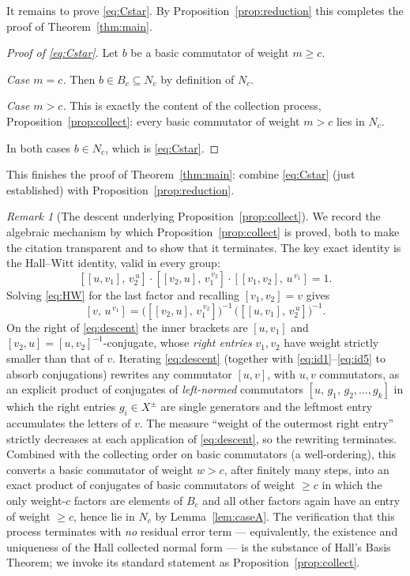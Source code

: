 \documentclass{amsart}
\theoremstyle{definition}
\theoremstyle{remark}
\newtheorem{remark}{Remark}
\begin{document}
It remains to prove \eqref{eq:Cstar}. By Proposition~\ref{prop:reduction} this
completes the proof of Theorem~\ref{thm:main}.

\begin{proof}[Proof of \eqref{eq:Cstar}]
Let $b$ be a basic commutator of weight $m\ge c$.

\emph{Case $m=c$.} Then $b\in B_c\subseteq N_c$ by definition of $N_c$.

\emph{Case $m>c$.} This is exactly the content of the collection process,
Proposition~\ref{prop:collect}: every basic commutator of weight $m>c$ lies in
$N_c$.

In both cases $b\in N_c$, which is \eqref{eq:Cstar}.
\end{proof}

This finishes the proof of Theorem~\ref{thm:main}: combine
\eqref{eq:Cstar} (just established) with Proposition~\ref{prop:reduction}.

\begin{remark}[The descent underlying Proposition~\ref{prop:collect}]
\label{rem:descent}
We record the algebraic mechanism by which Proposition~\ref{prop:collect} is
proved, both to make the citation transparent and to show that it terminates. The
key exact identity is the Hall--Witt identity, valid in every group:
\begin{equation}\label{eq:HW}
[[u,v_1],\,v_2^{\,u}]\cdot[[v_2,u],\,v_1^{\,v_2}]\cdot[[v_1,v_2],\,u^{\,v_1}]=1 .
\end{equation}
Solving \eqref{eq:HW} for the last factor and recalling $[v_1,v_2]=v$ gives
\begin{equation}\label{eq:descent}
[v,\,u^{\,v_1}]=\big([[v_2,u],\,v_1^{\,v_2}]\big)^{-1}\,
\big([[u,v_1],\,v_2^{\,u}]\big)^{-1}.
\end{equation}
On the right of \eqref{eq:descent} the inner brackets are $[u,v_1]$ and
$[v_2,u]=[u,v_2]^{-1}$-conjugate, whose \emph{right entries} $v_1,v_2$ have
weight strictly smaller than that of $v$. Iterating \eqref{eq:descent}
(together with \eqref{eq:id1}--\eqref{eq:id5} to absorb conjugations) rewrites any
commutator $[u,v]$, with $u,v$ commutators, as an explicit product of conjugates
of \emph{left-normed} commutators
$[u,\,g_1,\,g_2,\dots,g_k]$ in which the right entries $g_i\in X^{\pm}$ are single
generators and the leftmost entry accumulates the letters of $v$. The measure
``weight of the outermost right entry'' strictly decreases at each application of
\eqref{eq:descent}, so the rewriting terminates. Combined with the collecting
order on basic commutators (a well-ordering), this converts a basic commutator of
weight $w>c$, after finitely many steps, into an exact product of conjugates of
basic commutators of weight $\ge c$ in which the only weight-$c$ factors are
elements of $B_c$ and all other factors again have an entry of weight $\ge c$,
hence lie in $N_c$ by Lemma~\ref{lem:caseA}. The verification that this process
terminates with \emph{no} residual error term --- equivalently, the existence and
uniqueness of the Hall collected normal form --- is the substance of Hall's Basis
Theorem; we invoke its standard statement as Proposition~\ref{prop:collect}.
\end{remark}
\end{document}
